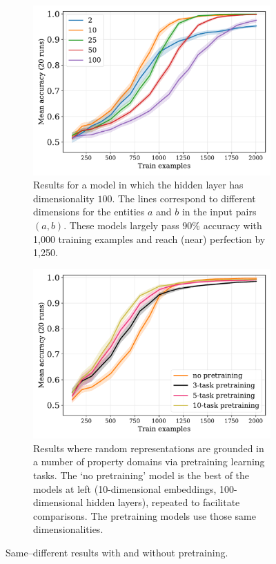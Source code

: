 \documentclass{article}
\newcommand{\update}[1]{#1}
\begin{document}
\begin{figure}[tp]
\centering
\begin{subfigure}[t]{0.48\linewidth}
 \includegraphics[width=1\linewidth]{./equality-train_size-embed_dim-hidden_dim=100.pdf}
 \vspace{-4mm}
 \caption{Results for a model in which the hidden layer has dimensionality $100$. The lines correspond to different dimensions for the entities $a$ and $b$ in the input pairs $(a, b)$. These models largely pass 90\% accuracy with 1,000 training examples and reach (near) perfection by 1,250.}
 \label{fig:equality--smallresults}
\end{subfigure}
\hfill
\begin{subfigure}[t]{0.48\linewidth}
 \centering
 \includegraphics[width=1\linewidth]{./equality-pretrain-compare-train_size-pretrained-embed_dim=None.pdf}
 \caption{\update{Results where random representations are grounded in a number of property domains via pretraining learning tasks. The `no pretraining' model is the best of the models at left (10-dimensional embeddings, 100-dimensional hidden layers), repeated to facilitate comparisons. The pretraining models use those same dimensionalities.}}
 \label{fig:basic-equality-pretrain}
\end{subfigure}
\caption{Same--different results with and without pretraining.}
\end{figure}
\end{document}
